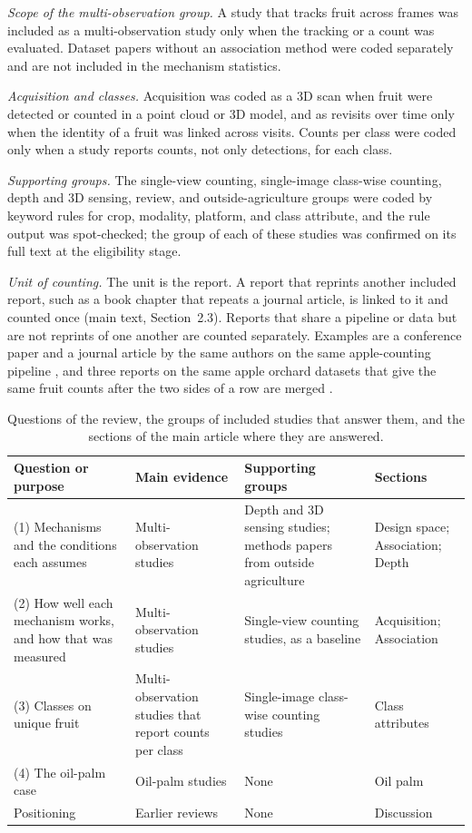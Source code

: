 \documentclass[a4paper,11pt]{article}
\begin{document}
\textit{Scope of the multi-observation group.} A study that tracks fruit across frames was included as a multi-observation study only when the tracking or a count was evaluated. Dataset papers without an association method were coded separately and are not included in the mechanism statistics.

\textit{Acquisition and classes.} Acquisition was coded as a 3D scan when fruit were detected or counted in a point cloud or 3D model, and as revisits over time only when the identity of a fruit was linked across visits. Counts per class were coded only when a study reports counts, not only detections, for each class.

\textit{Supporting groups.} The single-view counting, single-image class-wise counting, depth and 3D sensing, review, and outside-agriculture groups were coded by keyword rules for crop, modality, platform, and class attribute, and the rule output was spot-checked; the group of each of these studies was confirmed on its full text at the eligibility stage.

\textit{Unit of counting.} The unit is the report. A report that reprints another included report, such as a book chapter that repeats a journal article, is linked to it and counted once (main text, Section~2.3). Reports that share a pipeline or data but are not reprints of one another are counted separately. Examples are a conference paper and a journal article by the same authors on the same apple-counting pipeline \citep{osman2021yieldb,osman2021yield}, and three reports on the same apple orchard datasets that give the same fruit counts after the two sides of a row are merged \citep{roy2019vision,dong2020semantic,hani2020comparative}.

\begin{table}[ht]
\centering
\caption{Questions of the review, the groups of included studies that answer them, and the sections of the main article where they are answered.}\label{tab:rqmap}
\footnotesize
\begin{tabularx}{\textwidth}{@{}L{4.6cm}L{3.6cm}YL{2.6cm}@{}}
\toprule
Question or purpose & Main evidence & Supporting groups & Sections\\
\midrule
(1) Mechanisms and the conditions each assumes & Multi-observation studies & Depth and 3D sensing studies; methods papers from outside agriculture & Design space; Association; Depth\\
(2) How well each mechanism works, and how that was measured & Multi-observation studies & Single-view counting studies, as a baseline & Acquisition; Association\\
(3) Classes on unique fruit & Multi-observation studies that report counts per class & Single-image class-wise counting studies & Class attributes\\
(4) The oil-palm case & Oil-palm studies & None & Oil palm\\
Positioning & Earlier reviews & None & Discussion\\
\bottomrule
\end{tabularx}
\end{table}
\end{document}
